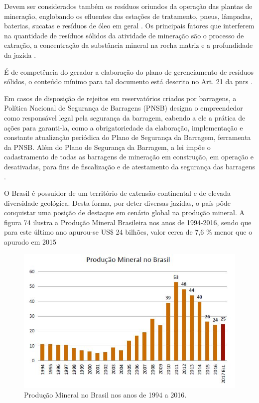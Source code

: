 	Devem ser considerados também os resíduos oriundos da operação das plantas de mineração, englobando os efluentes das estações de tratamento, pneus, lâmpadas, baterias, sucatas e resíduos de óleo em geral \cite{IBRAM2016}. Os principais fatores que interferem na quantidade de resíduos sólidos da atividade de mineração são o processo de extração, a concentração da substância mineral na rocha matriz e a profundidade da jazida \cite{IPEA2012c}.
	
	É de competência do gerador a elaboração do plano de gerenciamento de resíduos sólidos, o conteúdo mínimo para tal documento está descrito no Art. 21 da \gls{pnrs} \cite{brasil:12305}.
	
	Em casos de disposição de rejeitos em reservatórios criados por barragens, a Política Nacional de Segurança de Barragens (PNSB) designa o empreendedor como responsável legal pela segurança da barragem, cabendo a ele a prática de ações para garanti-la, como a obrigatoriedade da elaboração, implementação e constante atualização periódica do Plano de Segurança da Barragem, ferramenta da PNSB. Além do Plano de Segurança da Barragem, a lei impõe o cadastramento de todas as barragens de mineração em construção, em operação e desativadas, para fins de fiscalização e de atestamento da segurança das barragens \cite{brasil:12334}.

	O Brasil é possuidor de um território de extensão continental e de elevada diversidade geológica. Desta forma, por deter diversas jazidas, o país pôde conquistar uma posição de destaque em cenário global na produção mineral. A figura 74 ilustra a Produção Mineral Brasileira nos anos de 1994-2016, sendo que para este último ano apurou-se US\$ 24 bilhões, valor cerca de 7,6 \% menor que o apurado em 2015 %
	
	\begin{figure}
		\centering
		\includegraphics[width=0.75\linewidth]{produtos/prodtres/image090}
		\caption{Produção Mineral no Brasil nos anos de 1994 a 2016.}
		\label{fig:image090}
	\end{figure}
	
